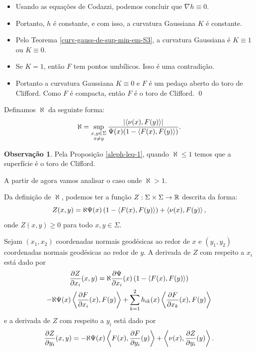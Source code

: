 \documentclass[12pt,a4paper]{beamer}
\theoremstyle{definition}
\newtheorem{observacao}{Observação}
\begin{document}
\begin{frame}[allowframebreaks]
\begin{itemize}
		\item Usando as equações de Codazzi, podemos concluir que $\nabla h \equiv 0$.
		
		\item Portanto, $h$ é constante, e com isso, a curvatura Gaussiana $K$ é constante.

		\item Pelo Teorema \ref{curv-gauss-de-sup-min-em-S3}, a curvatura Gaussiana é $K \equiv 1$ ou $K \equiv 0$.
		
		\item Se $K=1$, então $F$ tem pontos umbílicos. 
		Isso é uma contradição.
		
		\item Portanto a curvatura Gaussiana $K \equiv 0$ e $F$ é um pedaço aberto do toro de Clifford.
		Como $F$ é compacta, então $F$ é o toro de Clifford.
		\qed
	\end{itemize}

	Definamos $\aleph$ da seguinte forma:
	\begin{equation*}
	\aleph = \sup_{\substack{x,y \in \Sigma \\ x \neq y}} \frac{\left| \left\langle \nu(x),F(y) \right\rangle \right|}{\Psi(x) (1-\left\langle F(x),F(y) \right\rangle)}.
	\end{equation*}
	
	
	\begin{observacao}
		Pela Proposição \ref{aleph-leq-1}, quando $\aleph \leq 1$ temos que a superfície é o toro de Clifford. 
	\end{observacao}

	A partir de agora vamos analisar o caso onde $\aleph > 1$.
	
	
	Da definição de $\aleph$, podemos ter a função $Z: \Sigma \times \Sigma \rightarrow \mathbb R$ descrita da forma:
	\begin{equation*}
		Z(x,y) = \aleph \Psi(x) \left(1 - \left\langle F(x),F(y) \right\rangle \right) + \left\langle \nu(x),F(y) \right\rangle,
	\end{equation*}
	onde $Z(x,y) \geq 0$ para todo $x,y \in \Sigma$.
	
	Sejam $(x_1,x_2)$ coordenadas normais geodésicas ao redor de $x$ e $(y_1,y_2)$ coordenadas normais geodésicas ao redor de $y$.
	A derivada de $Z$ com respeito a $x_i$ está dado por
	\begin{multline*}
		\frac{\partial Z}{\partial x_i}(x,y) = \aleph \frac{\partial \Psi}{\partial x_i}(x) \left( 1 - \left\langle F(x),F(y) \right\rangle \right) \\
		-\aleph \Psi(x) \left\langle \frac{\partial F}{\partial x_i}(x),F(y) \right\rangle + \sum_{k=1}^{2} h_{ik}(x) \left\langle \frac{\partial F}{\partial x_k}(x),F(y) \right\rangle
	\end{multline*}
	e a derivada de $Z$ com respeito a $y_i$ está dado por
	\begin{equation*}
		\frac{\partial Z}{\partial y_i}(x,y) = -\aleph \Psi(x) \left\langle F(x),\frac{\partial F}{\partial y_i}(y) \right\rangle + \left\langle \nu(x),\frac{\partial Z}{\partial y_i}(y) \right\rangle.
	\end{equation*}
	



\end{frame}
\end{document}
